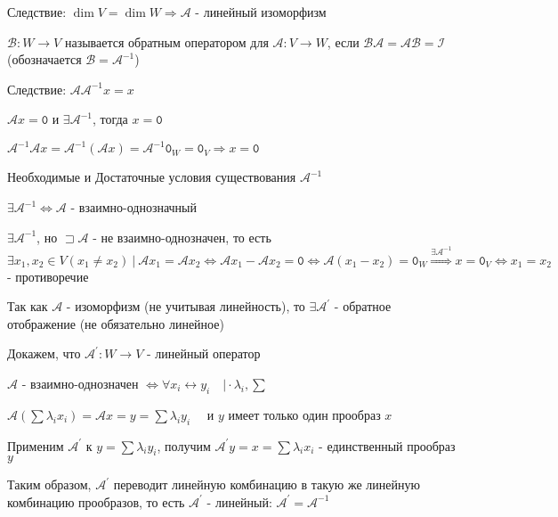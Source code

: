 \documentclass[12pt]{article}
\begin{document}
    Следствие: $\dim V = \dim W \Longrightarrow \mathcal{A}$ - линейный изоморфизм

    \hypertarget{reverselinearoperator}{}

    \Def $\mathcal{B} : W \rightarrow V$ называется обратным оператором для $\mathcal{A} : V \rightarrow W$,
    если $\mathcal{B}\mathcal{A} = \mathcal{A}\mathcal{B} = \mathcal{I}$ (обозначается $\mathcal{B} = \mathcal{A}^{-1}$)

    Следствие: $\mathcal{A}\mathcal{A}^{-1} x = x$

    \begin{MyTheorem}
        \Ths $\mathcal{A}x = \texttt{0}$ и $\exists \mathcal{A}^{-1}$, тогда $x = \texttt{0}$
    \end{MyTheorem}

    \begin{MyProof}
        $\mathcal{A}^{-1}\mathcal{A} x = \mathcal{A}^{-1}(\mathcal{A} x) = \mathcal{A}^{-1} \texttt{0}_W = \texttt{0}_V \Longrightarrow x = \texttt{0}$
    \end{MyProof}

    \begin{MyTheorem}
        \Ths Необходимые и Достаточные условия существования $\mathcal{A}^{-1}$

        $\exists \mathcal{A}^{-1} \Longleftrightarrow \mathcal{A}$ - взаимно-однозначный
    \end{MyTheorem}

    \begin{MyProof}
        \fbox{$\Longrightarrow$} $\exists \mathcal{A}^{-1}$, но $\sqsupset \mathcal{A}$ - не взаимно-однозначен, то есть
        $\exists x_1, x_2 \in V (x_1 \neq x_2) \ | \ \mathcal{A}x_1 = \mathcal{A}x_2 \Longleftrightarrow \mathcal{A}x_1 - \mathcal{A}x_2 = \texttt{0} \Longleftrightarrow
        \mathcal{A}(x_1 - x_2) = \texttt{0}_W \stackrel{\exists \mathcal{A}^{-1}}{\Longrightarrow} x = \texttt{0}_V \Longleftrightarrow x_1 = x_2$ - противоречие


        \fbox{$\Longleftarrow$} Так как $\mathcal{A}$ - изоморфизм (не учитывая линейность), 
        то $\exists \mathcal{A}^\prime$ - обратное отображение (не обязательно линейное)

        Докажем, что $\mathcal{A}^\prime : W \rightarrow V$ - линейный оператор

        $\mathcal{A}$ - взаимно-однозначен $\Longleftrightarrow \forall x_i \longleftrightarrow y_i \quad \Big| \cdot \lambda_i, \sum$

        $\mathcal{A}\left(\sum \lambda_i x_i\right) = \mathcal{A} x = y = \sum \lambda_i y_i \quad$ и $y$ имеет только один прообраз $x$

        Применим $\mathcal{A}^\prime$ к $y = \sum \lambda_i y_i$, получим $\mathcal{A}^\prime y = x = \sum \lambda_i x_i$ - единственный прообраз $y$

        Таким образом, $\mathcal{A}^\prime$ переводит линейную комбинацию в такую же линейную комбинацию прообразов, то есть $\mathcal{A}^\prime$ - линейный: $\mathcal{A}^\prime = \mathcal{A}^{-1}$
    \end{MyProof}
\end{document}
